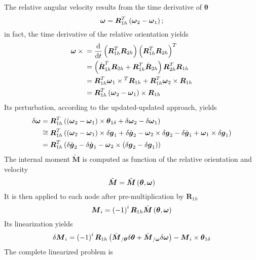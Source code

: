 \documentclass[10pt,dvips,fleqn]{report}
\newcommand{\T}[1]{\boldsymbol{#1}}
\begin{document}
The relative angular velocity results from the time derivative
of $\T{\theta}$
\begin{equation}
	\T{\omega} = \T{R}_{1h}^T\plbr{\T{\omega}_2 - \T{\omega}_1} ;
\end{equation}
in fact, the time derivative of the relative orientation yields
\begin{align}
	\T{\omega} \times{}
	&= \frac{\mathrm{d}}{\mathrm{d}t}\plbr{\T{R}_{1h}^T \T{R}_{2h}}\plbr{\T{R}_{1h}^T \T{R}_{2h}}^T \\
	&= \plbr{\dot{\T{R}}_{1h}^T \T{R}_{2h} + \T{R}_{1h}^T \dot{\T{R}}_{2h}} \T{R}_{2h}^T \T{R}_{1h} \\
	&= \T{R}_{1h}^T \T{\omega}_1 \times{}^T \T{R}_{1h} + \T{R}_{1h}^T \T{\omega}_2 \times \T{R}_{1h} \\
	&= \T{R}_{1h}^T \plbr{\T{\omega}_2 - \T{\omega}_1} \times \T{R}_{1h}
\end{align}
Its perturbation, according to the updated-updated approach, yields
\begin{align}
	\delta\T{\omega} &= \T{R}_{1h}^T\plbr{
		\plbr{\T{\omega}_2 - \T{\omega}_1} \times \T{\theta}_{1\delta}
		+ \delta\T{\omega}_2
		- \delta\T{\omega}_1
	} \\
	&\cong \T{R}_{1h}^T\plbr{
		\plbr{\T{\omega}_2 - \T{\omega}_1} \times \delta\T{g}_1
		+ \delta\dot{\T{g}}_2 - \T{\omega}_2 \times \delta\T{g}_2
		- \delta\dot{\T{g}}_1 + \T{\omega}_1 \times \delta\T{g}_1
	} \\
	&= \T{R}_{1h}^T\plbr{
		\delta\dot{\T{g}}_2
		- \delta\dot{\T{g}}_1
		- \T{\omega}_2 \times \plbr{\delta\T{g}_2 - \delta\T{g}_1}
	}
\end{align}
The internal moment $\tilde{\T{M}}$ is computed as function
of the relative orientation and velocity
\begin{equation}
	\tilde{\T{M}} = \tilde{\T{M}}\plbr{\T{\theta}, \T{\omega}}
\end{equation}
It is then applied to each node after pre-multiplication by $\T{R}_{1h}$
\begin{equation}
	\T{M}_i = \plbr{-1}^i \T{R}_{1h} \tilde{\T{M}}\plbr{\T{\theta}, \T{\omega}}
\end{equation}
Its linearization yields
\begin{equation}
	\delta\T{M}_i = \plbr{-1}^i \T{R}_{1h} \plbr{
		\tilde{\T{M}}_{/\T{\theta}} \delta \T{\theta}
		+ \tilde{\T{M}}_{/\T{\omega}} \delta\T{\omega}
	} - \T{M}_i \times \T{\theta}_{1\delta}
\end{equation}
The complete linearized problem is
\end{document}
